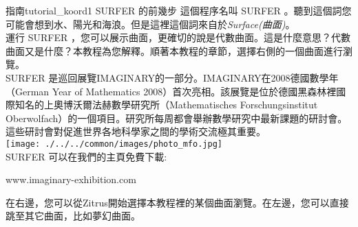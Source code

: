 \begin{surferIntroPage}{指南}{tutorial_koord1}{ SURFER 的前幾步}
這個程序名叫 SURFER 。聽到這個詞您可能會想到水、陽光和海浪。但是這裡這個詞來自於\textit{Surface(曲面)}。
\\

運行 SURFER ，您可以展示曲面，更確切的說是代數曲面。這是什麼意思？代數曲面又是什麼？本教程為您解釋。順著本教程的章節，選擇右側的一個曲面進行瀏覽。\\
 SURFER 是巡回展覽IMAGINARY的一部分。IMAGINARY在2008德國數學年（German Year of Mathematics 2008）首次亮相。該展覽是位於德國黑森林裡國際知名的上奧博沃爾法赫數學研究所（Mathematisches Forschungsinstitut Oberwolfach）的一個項目。研究所每周都會舉辦數學研究中最新課題的研討會。這些研討會對促進世界各地科學家之間的學術交流極其重要。\\
\vspace{0.2cm} \hspace{3.5cm}\texttt{[image: ./../../common/images/photo\_mfo.jpg]}\\
 SURFER 可以在我們的主頁免費下載: \\
\begin{centering}
www.imaginary-exhibition.com\\
\end{centering}
 \vspace{0.2cm}
在右邊，您可以從Zitrus開始選擇本教程裡的某個曲面瀏覽。在左邊，您可以直接跳至其它曲面，比如夢幻曲面。
\end{surferIntroPage}
